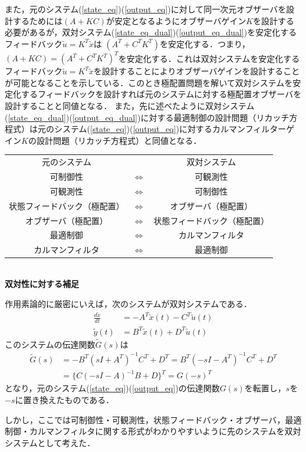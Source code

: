 また，元のシステム(\ref{state_eq})(\ref{output_eq})に対して同一次元オブザーバを設計するためには$(A+KC)$が安定となるようにオブザーバゲイン$K$を設計する必要があるが，双対システム(\ref{state_eq_dual})(\ref{output_eq_dual})を安定化するフィードバック$\tilde{u} =  K^T \tilde{x}$は
$(A^T + C^T K^T)$を安定化する．つまり，$(A + K C) = (A^T + C^T K^T)^T$を安定化する．これは双対システムを安定化するフィードバック$\tilde{u} =  K^T \tilde{x}$を設計することによりオブザーバゲインを設計することが可能となることを示している．このとき極配置問題を解いて双対システムを安定化するフィードバックを設計すれば元のシステムに対する極配置オブザーバを設計することと同値となる．
また，先に述べたように双対システム(\ref{state_eq_dual})(\ref{output_eq_dual})に対する最適制御の設計問題（リカッチ方程式）は元のシステム(\ref{state_eq})(\ref{output_eq})に対するカルマンフィルターゲイン$K$の設計問題（リカッチ方程式）と同値となる．

\begin{center}
\begin{tabular}{ccc}
	元のシステム				&					&	双対システム	\\
	可制御性					& $\Leftrightarrow$ &	可観測性 \\
	可観測性					& $\Leftrightarrow$ &	可制御性 \\
	状態フィードバック（極配置）& $\Leftrightarrow$ &	オブザーバ（極配置） \\
	オブザーバ（極配置）		& $\Leftrightarrow$ &	状態フィードバック（極配置） \\
	最適制御					& $\Leftrightarrow$ &	カルマンフィルタ \\
	カルマンフィルタ			& $\Leftrightarrow$ &	最適制御 \\
\end{tabular}
\end{center}
\ \\

\noindent
{\bf 双対性に対する補足}

作用素論的に厳密にいえば，次のシステムが双対システムである．
\begin{align}
 \frac{d \tilde{x}}{dt} &= -A^T \tilde{x}(t) - C^T \tilde{u}(t) \label{state_eq_dual_2} \\
 \tilde{y}(t) &= B^T \tilde{x}(t) + D^T \tilde{u}(t) \label{output_eq_dual_2}
\end{align}
このシステムの伝達関数$\tilde{G}(s)$は
\begin{align}
	\tilde{G}(s) &= - B^T (sI+A^T)^{-1} C^T + D^T=  B^T (-sI-A^T)^{-1} C^T + D^T 
\nonumber \\
	&= \{C(-sI-A)^{-1}B + D\}^T = G(-s)^T
\end{align}
となり，元のシステム(\ref{state_eq})(\ref{output_eq})の伝達関数$G(s)$を転置し，$s$を$-s$に置き換えたものである．

しかし，ここでは可制御性・可観測性，状態フィードバック・オブザーバ，最適制御・カルマンフィルタに関する形式がわかりやすいように先のシステムを双対システムとして考えた．

